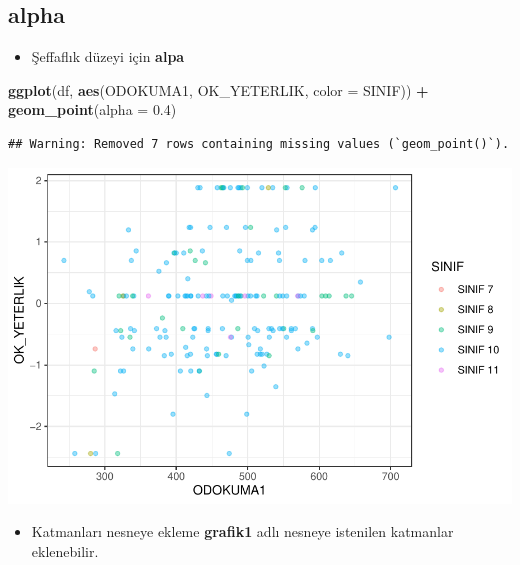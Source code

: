 \documentclass[
  oneside]{book}
\newenvironment{Shaded}{\begin{snugshade}}{\end{snugshade}}
\newcommand{\AttributeTok}[1]{\textcolor[rgb]{0.13,0.29,0.53}{#1}}
\newcommand{\FloatTok}[1]{\textcolor[rgb]{0.00,0.00,0.81}{#1}}
\newcommand{\FunctionTok}[1]{\textcolor[rgb]{0.13,0.29,0.53}{\textbf{#1}}}
\newcommand{\NormalTok}[1]{#1}
\newcommand{\SpecialCharTok}[1]{\textcolor[rgb]{0.81,0.36,0.00}{\textbf{#1}}}
\providecommand{\tightlist}{%
  \setlength{\itemsep}{0pt}\setlength{\parskip}{0pt}}
\begin{document}
\hypertarget{alpha}{%
\subsection{alpha}\label{alpha}}

\begin{itemize}
\tightlist
\item
  Şeffaflık düzeyi için \textbf{alpa}
\end{itemize}

\begin{Shaded}
\begin{Highlighting}[]
\FunctionTok{ggplot}\NormalTok{(df, }\FunctionTok{aes}\NormalTok{(ODOKUMA1, OK\_YETERLIK, }\AttributeTok{color =}\NormalTok{ SINIF)) }\SpecialCharTok{+}
  \FunctionTok{geom\_point}\NormalTok{(}\AttributeTok{alpha =} \FloatTok{0.4}\NormalTok{)}
\end{Highlighting}
\end{Shaded}

\begin{verbatim}
## Warning: Removed 7 rows containing missing values (`geom_point()`).
\end{verbatim}

\begin{center}\includegraphics[width=1\linewidth]{15-betimleyici-istatistik_files/figure-latex/unnamed-chunk-47-1} \end{center}

\begin{itemize}
\tightlist
\item
  Katmanları nesneye ekleme
  \textbf{grafik1} adlı nesneye istenilen katmanlar eklenebilir.
\end{itemize}
\end{document}
